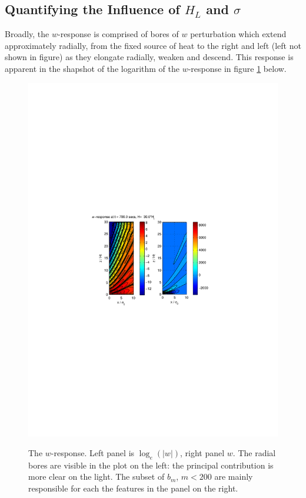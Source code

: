 \documentclass[12pt]{article}
\begin{document}
\subsection{Quantifying the Influence of $H_L$ and $\sigma$}
%
Broadly, the $w$-response is comprised of bores of $w$ perturbation which extend approximately radially, from the fixed source of heat to the right and left (left not shown in figure)
as they elongate radially, weaken and descend. This response is apparent in the shapshot of the logarithm of the $w$-response in figure \ref{fig_2} below. 
%
%
%
\begin{figure}[h]
\caption{The $w$-response. Left panel is $\log_e(|w|)$, right panel $w$. The radial bores are visible in the plot on the left: the principal contribution is more clear on the light. 
The subset of $b_m$, $m<200$ are mainly responsible for each the features in the panel on the right. } 
\includegraphics[scale=1.0,angle=-0] {fig2.pdf} 
\label{fig_2}
\end{figure}
%
%
%
\end{document}

